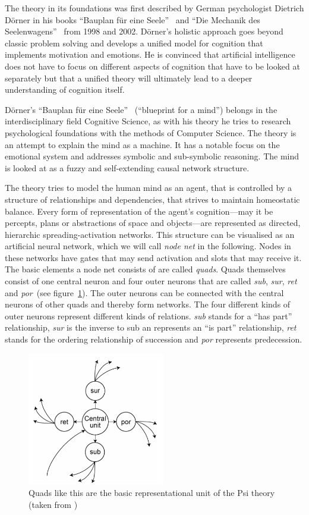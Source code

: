 The theory in its foundations was first described by German psychologist Dietrich Dörner in his books ``Bauplan für eine Seele''~\cite{Doerner1998} and ``Die Mechanik des Seelenwagens''~\cite{dorner2002mechanik} from 1998 and 2002. Dörner's holistic approach goes beyond classic problem solving and develops a unified model for cognition that implements motivation and emotions. He is convinced that artificial intelligence does not have to focus on different aspects of cognition that have to be looked at separately but that a unified theory will ultimately lead to a deeper understanding of cognition itself.
    
Dörner's ``Bauplan für eine Seele''~\cite{Doerner1998} (``blueprint for a mind'') belongs in the interdisciplinary field Cognitive Science, as with his theory he tries to research psychological foundations with the methods of Computer Science. The theory is an attempt to explain the mind as a machine. It has a notable focus on the emotional system and addresses symbolic and sub-symbolic reasoning.  The mind is looked at as a fuzzy and self-extending causal network structure.

The theory tries to model the human mind as an agent, that is controlled by a structure of relationships and dependencies, that strives to maintain homeostatic balance. Every form of representation of the agent's cognition---may it be percepts, plans or abstractions of space and objects---are represented as directed, hierarchic spreading-activation networks. This structure can be visualised as an artificial neural network, which we will call \emph{node net} in the following. Nodes in these networks have gates that may send activation and slots that may receive it. The basic elements a node net consists of are called \emph{quads}. Quads themselves consist of one central neuron and four outer neurons that are called \emph{sub}, \emph{sur}, \emph{ret} and \emph{por}~(see figure~\ref{quad}). The outer neurons can be connected with the central neurons of other quads and thereby form networks. The four different kinds of outer neurons represent different kinds of relations. \emph{sub} stands for a ``has part'' relationship, \emph{sur} is the inverse to sub an represents an ``is part'' relationship, \emph{ret} stands for the ordering relationship of succession and \emph{por} represents predecession.

\begin{figure}[h]
  \centering
    \includegraphics[width=6cm]{graphics/quad}
  \caption{Quads like this are the basic representational unit of the Psi theory (taken from \cite{Bach:2009:PSI:1611304})}
  \label{quad}
\end{figure}

